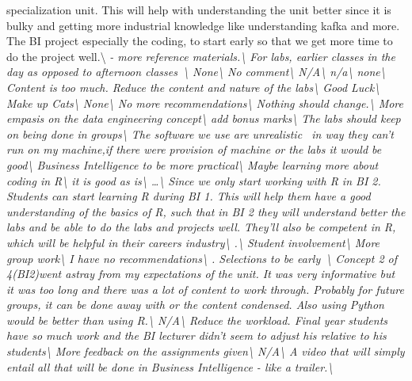 \documentclass[
]{article}
\begin{document}
specialization unit. This will help with understanding the unit better
since it is bulky and getting more industrial knowledge like
understanding kafka and more. The BI project especially the coding, to
start early so that we get more time to do the project
well.\textbackslash{} \hline \emph{- more reference
materials.\textbackslash{} \hline For labs, earlier classes in the day
as opposed to afternoon classes~\textbackslash{} \hline
None\textbackslash{} \hline No comment\textbackslash{} \hline
N/A\textbackslash{} \hline n/a\textbackslash{} \hline
none\textbackslash{} \hline Content is too much. Reduce the content and
nature of the labs\textbackslash{} \hline Good Luck\textbackslash{}
\hline Make up Cats\textbackslash{} \hline None\textbackslash{} \hline
No more recommendations\textbackslash{} \hline Nothing should
change.\textbackslash{} \hline More empasis on the data engineering
concept\textbackslash{} \hline add bonus marks\textbackslash{} \hline
The labs should keep on being done in groups\textbackslash{} \hline The
software we use are unrealistic~ in way they can't run on my machine,if
there were provision of machine or the labs it would be
good\textbackslash{} \hline Business Intelligence to be more
practical\textbackslash{} \hline Maybe learning more about coding in
R\textbackslash{} \hline it is good as is\textbackslash{} \hline
\ldots\textbackslash{} \hline Since we only start working with R in BI
2. Students can start learning R during BI 1. This will help them have a
good understanding of the basics of R, such that in BI 2 they will
understand better the labs and be able to do the labs and projects well.
They'll also be competent in R, which will be helpful in their careers
industry\textbackslash{} \hline .\textbackslash{} \hline Student
involvement\textbackslash{} \hline More group work\textbackslash{}
\hline I have no recommendations\textbackslash{} . Selections to be early~\textbackslash{} \hline Concept 2 of
4(BI2)went astray from my expectations of the unit. It was very
informative but it was too long and there was a lot of content to work
through. Probably for future groups, it can be done away with or the
content condensed. Also using Python would be better than using
R.\textbackslash{} \hline N/A\textbackslash{} \hline Reduce the
workload. Final year students have so much work and the BI lecturer
didn't seem to adjust his relative to his students\textbackslash{}
\hline More feedback on the assignments given\textbackslash{} \hline
N/A\textbackslash{} \hline A video that will simply entail all that will
be done in Business Intelligence - like a trailer.\textbackslash{}
}
\end{document}
